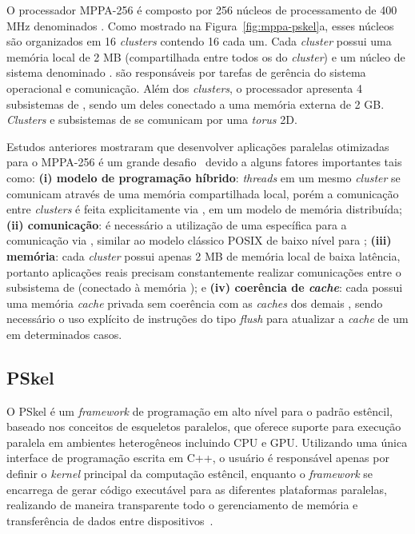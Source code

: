 \documentclass[12pt]{article}
\newcommand{\fw}{\textit{framework}\xspace}
\newcommand{\pskel}{{\small \textsf{PSkel}}\xspace}
\newcommand{\mppa}{{\small \textsf{MPPA-256}}\xspace}
\begin{document}
O processador \mppa é composto por 256 núcleos de processamento de 400 MHz denominados \pes. Como mostrado na Figura~\ref{fig:mppa-pskel}a, esses núcleos são organizados em 16 \emph{clusters} contendo 16 \pes cada um. Cada \textit{cluster} possui uma memória local de 2 MB (compartilhada entre todos os \pes do \textit{cluster}) e um núcleo de sistema denominado \rman. \rmans são responsáveis por tarefas de gerência do sistema operacional e comunicação. Além dos \textit{clusters}, o processador apresenta 4 subsistemas de \io, sendo um deles conectado a uma memória externa \lpddr de 2 GB. \emph{Clusters} e subsistemas de \io se comunicam por uma \noc \textit{torus} 2D.



Estudos anteriores mostraram que desenvolver aplicações paralelas otimizadas para o \mppa é um grande desafio~\cite{Castro-IA3-JPDC:2014} devido a alguns fatores importantes tais como: \textbf{(i) modelo de programação híbrido}: \textit{threads} em um mesmo \textit{cluster} se comunicam através de uma memória compartilhada local, porém a comunicação entre \textit{clusters} é feita explicitamente via \noc, em um modelo de memória distribuída; \textbf{(ii) comunicação}: é necessário a utilização de uma \api específica para a comunicação via \noc, similar ao modelo clássico POSIX de baixo nível para \ipc; \textbf{(iii) memória}: cada \textit{cluster} possui apenas 2 MB de memória local de baixa latência, portanto aplicações reais precisam constantemente realizar comunicações entre o subsistema de \io (conectado à memória \lpddr); e \textbf{(iv) coerência de \textit{cache}}: cada \pe possui uma
memória \textit{cache} privada sem coerência com as \textit{caches} dos demais \pes, sendo necessário o uso explícito de instruções do tipo \textit{flush} para atualizar a \textit{cache} de um \pe em determinados casos.

\subsection{PSkel}
\label{subsec:pskel}

O \pskel é um \fw de programação em alto nível para o padrão estêncil, baseado nos conceitos de esqueletos paralelos, que oferece suporte para execução paralela em ambientes heterogêneos incluindo CPU e GPU.  Utilizando uma única interface de programação escrita em C++, o usuário é responsável apenas por definir o \textit{kernel} principal da computação estêncil, enquanto o \fw se encarrega de gerar código executável para as diferentes plataformas paralelas, realizando de maneira transparente todo o gerenciamento de memória e transferência de dados entre dispositivos~\cite{pereira15}.
\end{document}
